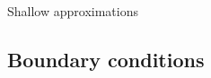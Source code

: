 \begin{CJK}{UTF8}{min}

    \begin{frame}{Shallow approximations}
      
    \end{frame}


\subsection{Boundary conditions}


\end{CJK}
